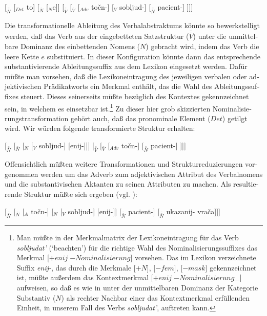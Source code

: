 \documentclass[output=paper]{langscibook}
\begin{document}
\begin{otherlanguage}{german}
\ea \label{ex:zi83:8} [$_{\bar{\bar{N}}}$ [$_{Det}$ to] [$_{\bar{N}}$ [$_{N}$e]] [$_{\bar{\bar{V}}}$ [$_{\bar{V}}$ [$_{Adv}$ točn-] [$_{V}$ sobljud-] [$_{\bar{\bar{N}}}$ pacient-] ]]]
\z

\noindent Die transformationelle Ableitung des Verbalabstraktums könnte so bewerkstelligt werden, daß das Verb aus der eingebetteten Satzstruktur ($\bar{\bar{V}}$) unter die unmittelbare Dominanz des einbettenden Nomens ($N$) gebracht wird, indem das Verb die leere Kette $e$ substituiert. In dieser Konfiguration könnte dann das entsprechende substantivierende Ableitungssuffix aus dem Lexikon eingesetzt werden. Dafür müßte man vorsehen, daß die Lexikoneintragung des jeweiligen verbalen oder adjektivischen Prädikatworts ein Merkmal enthält, das die Wahl des Ableitungssuffixes steuert. Dieses seinerseits müßte bezüglich des Kontextes gekennzeichnet sein, in welchem es einsetzbar ist.\footnote{Man müßte in der Merkmalmatrix der Lexikoneintragung für das Verb \textit{sobljudat’} (‘beachten’) für die richtige Wahl des Nominalisierungssuffixes das Merkmal [${+ enij} \; {- Nominalisierung}$] vorsehen. Das im Lexikon verzeichnete Suffix \textit{enij-}, das durch die Merkmale [$+ N$], [$- fem$], [$- mask$] gekennzeichnet ist, müßte außerdem das Kontextmerkmal [${+ enij} \; {- Nominalisierung}$\_] aufweisen, so daß es wie in  unter der unmittelbaren Dominanz der Kategorie Substantiv ($N$) als rechter Nachbar einer das Kontextmerkmal erfüllenden Einheit, in unserem Fall des Verbs \textit{sobljudat’}, auftreten kann.} Zu dieser hier grob skizzierten Nominalisierungstransformation gehört auch, daß das pronominale Element ($Det$) getilgt wird. Wir würden folgende transformierte Struktur erhalten:

\ea \label{ex:zi83:9} [$_{\bar{\bar{N}}}$ [$_{\bar{N}}$ [$_{N}$ [$_{V}$ sobljud-] [enij-]]] [$_{\bar{\bar{V}}}$ [$_{\bar{V}}$ [$_{Adv}$ točn-]  [$_{\bar{\bar{N}}}$ pacient-] ]]]
\z

\noindent Offensichtlich müßten weitere Transformationen und Strukturreduzierungen vor\-ge\-nom\-men werden um das Adverb zum adjektivischen Attribut des Verbalnomens und die substantivischen Aktanten zu seinen Attributen zu machen. Als resultierende Struktur müßte sich  ergeben (vgl. ):

\ea \label{ex:zi83:10} [$_{\bar{\bar{N}}}$ [$_{\bar{N}}$ [$_{A}$ točn-] [$_{N}$ [$_{V}$ sobljud-] [enij-]] [$_{\bar{\bar{N}}}$ pacient-]  [$_{\bar{\bar{N}}}$ ukazanij- vrača]]]
\z


\end{otherlanguage}
\end{document}
